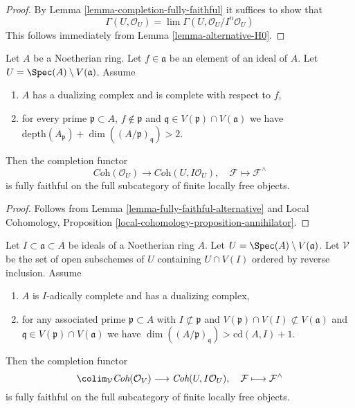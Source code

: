 \begin{proof}
By Lemma \ref{lemma-completion-fully-faithful}
it suffices to show that
$$
\Gamma(U, \mathcal{O}_U) =
\lim \Gamma(U, \mathcal{O}_U/I^n\mathcal{O}_U)
$$
This follows immediately from
Lemma \ref{lemma-alternative-H0}.
\end{proof}

\begin{lemma}
\label{lemma-fully-faithful-simple-two}
Let $A$ be a Noetherian ring. Let $f \in \mathfrak a$ be an element of
an ideal of $A$. Let $U = \Spec(A) \setminus V(\mathfrak a)$. Assume
\begin{enumerate}
\item $A$ has a dualizing complex and is complete with respect to $f$,
\item for every prime $\mathfrak p \subset A$, $f \not \in \mathfrak p$
and $\mathfrak q \in V(\mathfrak p) \cap V(\mathfrak a)$ we have
$\text{depth}(A_\mathfrak p) + \dim((A/\mathfrak p)_\mathfrak q) > 2$.
\end{enumerate}
Then the completion functor
$$
\textit{Coh}(\mathcal{O}_U)
\longrightarrow
\textit{Coh}(U, I\mathcal{O}_U),
\quad
\mathcal{F} \longmapsto \mathcal{F}^\wedge
$$
is fully faithful on the full subcategory of finite locally free objects.
\end{lemma}

\begin{proof}
Follows from Lemma \ref{lemma-fully-faithful-alternative} and
Local Cohomology, Proposition \ref{local-cohomology-proposition-annihilator}.
\end{proof}

\begin{lemma}
\label{lemma-fully-faithful-general}
Let $I \subset \mathfrak a \subset A$ be ideals of a Noetherian ring $A$.
Let $U = \Spec(A) \setminus V(\mathfrak a)$. Let $\mathcal{V}$ be
the set of open subschemes of $U$ containing $U \cap V(I)$
ordered by reverse inclusion. Assume
\begin{enumerate}
\item $A$ is $I$-adically complete and has a dualizing complex,
\item for any associated prime
$\mathfrak p \subset A$ with
$I \not \subset \mathfrak p$ and
$V(\mathfrak p) \cap V(I) \not \subset V(\mathfrak a)$
and $\mathfrak q \in V(\mathfrak p) \cap V(\mathfrak a)$ we have
$\dim((A/\mathfrak p)_\mathfrak q) > \text{cd}(A, I) + 1$.
\end{enumerate}
Then the completion functor
$$
\colim_\mathcal{V} \textit{Coh}(\mathcal{O}_V)
\longrightarrow
\textit{Coh}(U, I\mathcal{O}_U),
\quad
\mathcal{F} \longmapsto \mathcal{F}^\wedge
$$
is fully faithful on the full subcategory of
finite locally free objects.
\end{lemma}

